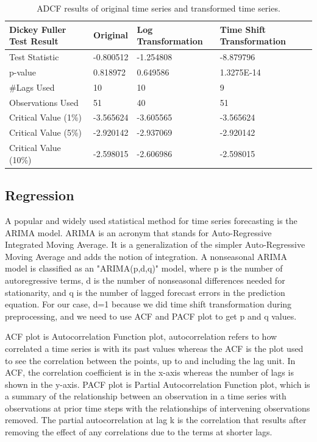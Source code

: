 \documentclass[runningheads]{llncs}
\begin{document}
\begin{table}
\caption{ADCF results of original time series and transformed time series.}\label{adcfResults}
\begin{tabular}{l|l|l|l}
\hline
Dickey Fuller Test Result & Original & Log Transformation & Time Shift Transformation\\
\hline
Test Statistic&	-0.800512&	-1.254808&	-8.879796\\
\hline
p-value	&0.818972&	0.649586&	1.3275E-14\\
\hline
\#Lags Used&	10	&10&	9\\
\hline
Observations Used	&51	&40&	51\\
\hline
Critical Value (1\%)&	-3.565624&	-3.605565&	-3.565624\\
\hline
Critical Value (5\%)&	-2.920142&	-2.937069&	-2.920142\\
\hline
Critical Value (10\%)&	-2.598015&	-2.606986&	-2.598015\\
\hline
\end{tabular}
\end{table}

\subsection{Regression}

A popular and widely used statistical method for time series forecasting is the ARIMA model. ARIMA is an acronym that stands for Auto-Regressive Integrated Moving Average. It is a generalization of the simpler Auto-Regressive Moving Average and adds the notion of integration. A nonseasonal ARIMA model is classified as an "ARIMA(p,d,q)" model, where p is the number of autoregressive terms, d is the number of nonseasonal differences needed for stationarity, and q is the number of lagged forecast errors in the prediction equation. For our case, d=1 because we did time shift transformation during preprocessing, and we need to use ACF and PACF plot to get p and q values.

ACF plot is Autocorrelation Function plot, autocorrelation refers to how correlated a time series is with its past values whereas the ACF is the plot used to see the correlation between the points, up to and including the lag unit. In ACF, the correlation coefficient is in the x-axis whereas the number of lags is shown in the y-axis. PACF plot is Partial Autocorrelation Function plot, which is a summary of the relationship between an observation in a time series with observations at prior time steps with the relationships of intervening observations removed. The partial autocorrelation at lag k is the correlation that results after removing the effect of any correlations due to the terms at shorter lags.
\end{document}
